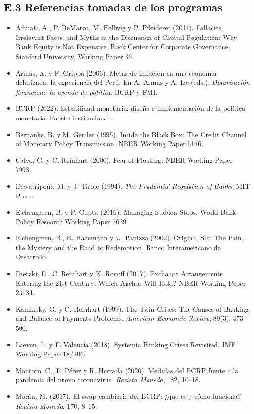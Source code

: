 \documentclass[11pt,a4paper]{article}
\begin{document}
\subsection*{E.3 Referencias tomadas de los programas}
{\small
\begin{itemize}[leftmargin=1.4em,itemsep=1pt,label={}]
\item Admati, A., P. DeMarzo, M. Hellwig y P. Pfleiderer (2011). Fallacies, Irrelevant Facts, and Myths in the Discussion of Capital Regulation: Why Bank Equity is Not Expensive. Rock Center for Corporate Governance, Stanford University, Working Paper 86.
\item Armas, A. y F. Grippa (2006). Metas de inflación en una economía dolarizada: la experiencia del Perú. En A. Armas y A. Ize (eds.), \emph{Dolarización financiera: la agenda de política}. BCRP y FMI.
\item BCRP (2022). Estabilidad monetaria: diseño e implementación de la política monetaria. Folleto institucional.
\item Bernanke, B. y M. Gertler (1995). Inside the Black Box: The Credit Channel of Monetary Policy Transmission. NBER Working Paper 5146.
\item Calvo, G. y C. Reinhart (2000). Fear of Floating. NBER Working Paper 7993.
\item Dewatripont, M. y J. Tirole (1994). \emph{The Prudential Regulation of Banks}. MIT Press.
\item Eichengreen, B. y P. Gupta (2016). Managing Sudden Stops. World Bank Policy Research Working Paper 7639.
\item Eichengreen, B., R. Hausmann y U. Panizza (2002). Original Sin: The Pain, the Mystery and the Road to Redemption. Banco Interamericano de Desarrollo.
\item Ilzetzki, E., C. Reinhart y K. Rogoff (2017). Exchange Arrangements Entering the 21st Century: Which Anchor Will Hold? NBER Working Paper 23134.
\item Kaminsky, G. y C. Reinhart (1999). The Twin Crises: The Causes of Banking and Balance-of-Payments Problems. \emph{American Economic Review}, 89(3), 473--500.
\item Laeven, L. y F. Valencia (2018). Systemic Banking Crises Revisited. IMF Working Paper 18/206.
\item Montoro, C., F. Pérez y R. Herrada (2020). Medidas del BCRP frente a la pandemia del nuevo coronavirus. \emph{Revista Moneda}, 182, 10--18.
\item Morán, M. (2017). El swap cambiario del BCRP: ¿qué es y cómo funciona? \emph{Revista Moneda}, 170, 8--15.

\end{itemize}}
\end{document}
